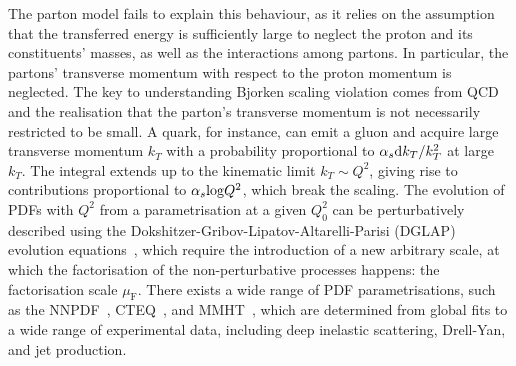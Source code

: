 The parton model fails to explain this behaviour, as it relies on the assumption that the transferred energy is sufficiently large to neglect the proton and its constituents' masses, as well as the interactions among partons. In particular, the partons' transverse momentum with respect to the proton momentum is neglected. The key to understanding Bjorken scaling violation comes from QCD and the realisation that the parton's transverse momentum is not necessarily restricted to be small. A quark, for instance, can emit a gluon and acquire large transverse momentum $k_T$ with a probability proportional to $\alpha_s \mathrm{d} k_T/k_T^2$ at large $k_T$. The integral extends up to the kinematic limit $k_T\sim Q^2$, giving rise to contributions proportional to $\alpha_s\mathrm{log}Q^2$, which break the scaling. The evolution of PDFs with $Q^2$ from a parametrisation at a given $Q^2_0$ can be perturbatively described using the Dokshitzer-Gribov-Lipatov-Altarelli-Parisi (DGLAP) evolution equations~\cite{Gribov:1972ri,Dokshitzer:1977sg,Altarelli:1977zs}, which require the introduction of a new arbitrary scale, at which the factorisation of the non-perturbative processes happens: the factorisation scale $\mu_\mathrm{F}$. There exists a wide range of PDF parametrisations, such as the NNPDF~\cite{NNPDF:2021njg}, CTEQ~\cite{Dulat:2015mca}, and MMHT~\cite{Harland-Lang:2014zoa}, which are determined from global fits to a wide range of experimental data, including deep inelastic scattering, Drell-Yan, and jet production.
